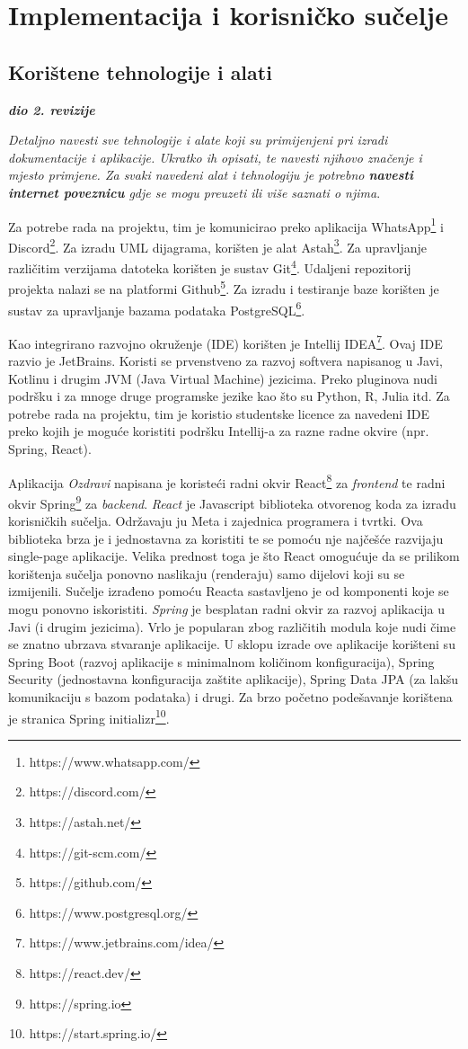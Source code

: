\chapter{Implementacija i korisničko sučelje}
		
		
		\section{Korištene tehnologije i alati}
		
			\textbf{\textit{dio 2. revizije}}
			
			 \textit{Detaljno navesti sve tehnologije i alate koji su primijenjeni pri izradi dokumentacije i aplikacije. Ukratko ih opisati, te navesti njihovo značenje i mjesto primjene. Za svaki navedeni alat i tehnologiju je potrebno \textbf{navesti internet poveznicu} gdje se mogu preuzeti ili više saznati o njima}.
			 
			 Za potrebe rada na projektu, tim je komunicirao preko aplikacija WhatsApp\footnote{https://www.whatsapp.com/} i Discord\footnote{https://discord.com/}. 
			 Za izradu UML dijagrama, korišten je alat Astah\footnote{https://astah.net/}.
			 Za upravljanje različitim verzijama datoteka korišten je sustav Git\footnote{https://git-scm.com/}.
			 Udaljeni repozitorij projekta nalazi se na platformi Github\footnote{https://github.com/}. Za izradu i testiranje baze korišten je sustav za upravljanje bazama podataka PostgreSQL\footnote{https://www.postgresql.org/}.
			 
			 Kao integrirano razvojno okruženje (IDE) korišten je Intellij IDEA\footnote{https://www.jetbrains.com/idea/}. Ovaj IDE razvio je JetBrains. Koristi se prvenstveno za razvoj softvera napisanog u Javi, Kotlinu i drugim JVM (Java Virtual Machine) jezicima. Preko pluginova nudi podršku i za mnoge druge programske jezike kao što su Python, R, Julia itd. Za potrebe rada na projektu, tim je koristio studentske licence za navedeni IDE preko kojih je moguće koristiti podršku Intellij-a za razne radne okvire (npr. Spring, React).
			 
			 Aplikacija \textit{Ozdravi} napisana je koristeći radni okvir React\footnote{https://react.dev/} za \textit{frontend} te radni okvir Spring\footnote{https://spring.io} za \textit{backend}.
			 \textit{React} je Javascript biblioteka otvorenog koda za izradu korisničkih sučelja. Održavaju ju Meta i zajednica programera i tvrtki. Ova biblioteka brza je i jednostavna za koristiti te se pomoću nje najčešće razvijaju single-page aplikacije. Velika prednost toga je što React omogućuje da se prilikom korištenja sučelja ponovno naslikaju (renderaju) samo dijelovi koji su se izmijenili. Sučelje izrađeno pomoću Reacta sastavljeno je od komponenti koje se mogu ponovno iskoristiti.
			 \textit{Spring} je besplatan radni okvir za razvoj aplikacija u Javi (i drugim jezicima). Vrlo je popularan zbog različitih modula koje nudi čime se znatno ubrzava stvaranje aplikacije. U sklopu izrade ove aplikacije korišteni su Spring Boot (razvoj aplikacije s minimalnom količinom konfiguracija), Spring Security (jednostavna konfiguracija zaštite aplikacije), Spring Data JPA (za lakšu komunikaciju s bazom podataka) i drugi. Za brzo početno podešavanje korištena je stranica Spring initializr\footnote{https://start.spring.io/}.
				
